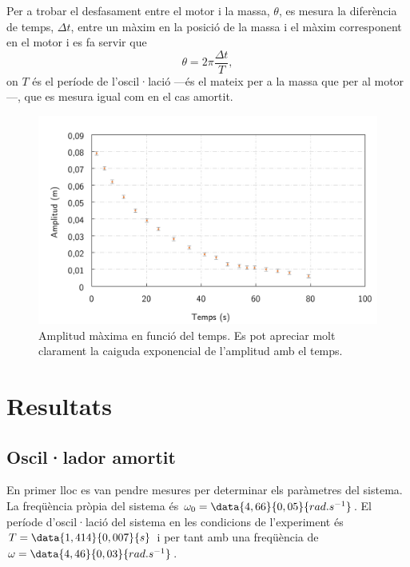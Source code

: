 Per a trobar el desfasament entre el motor i la massa, \( \theta \), es mesura la diferència de temps, \( \Delta t \), entre un màxim en la posició de la massa i el màxim corresponent en el motor i es fa servir que
\begin{equation}
  \theta = 2\pi \dfrac{\Delta t}{T}, 
\end{equation}
on \( T \) és el període de l'oscil·lació ---és el mateix per a la massa que per al motor---, que es mesura igual com en el cas amortit.  

\begin{figure}[htb]
	\centering
	\includegraphics[scale=0.6]{amplitud.png}
	\caption{Amplitud màxima en funció del temps. Es pot apreciar molt clarament la caiguda exponencial de l'amplitud amb el temps.}
	\label{fig:amplitud en funcio del temps}
\end{figure}

\section{Resultats} \label{sec:resultats}
\subsection{Oscil·lador amortit}
En primer lloc es van pendre mesures per determinar els paràmetres del sistema. La freqüència pròpia del sistema és \( \omega_0 = \data{4,66}{0,05}{rad.s^{-1}} \). El període d'oscil·lació del sistema en les condicions de l'experiment és \( T = \data{1,414}{0,007}{s} \) i per tant amb una freqüència de \( \omega = \data{4,46}{0,03}{rad.s^{-1}} \). 

